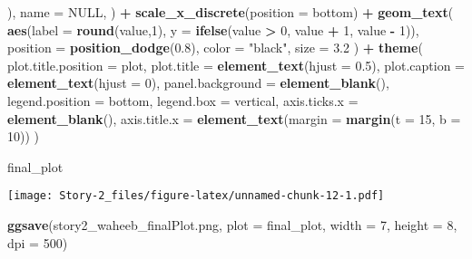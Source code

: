 \documentclass[
]{article}
\newenvironment{Shaded}{\begin{snugshade}}{\end{snugshade}}
\newcommand{\AttributeTok}[1]{\textcolor[rgb]{0.13,0.29,0.53}{#1}}
\newcommand{\ConstantTok}[1]{\textcolor[rgb]{0.56,0.35,0.01}{#1}}
\newcommand{\DecValTok}[1]{\textcolor[rgb]{0.00,0.00,0.81}{#1}}
\newcommand{\FloatTok}[1]{\textcolor[rgb]{0.00,0.00,0.81}{#1}}
\newcommand{\FunctionTok}[1]{\textcolor[rgb]{0.13,0.29,0.53}{\textbf{#1}}}
\newcommand{\NormalTok}[1]{#1}
\newcommand{\SpecialCharTok}[1]{\textcolor[rgb]{0.81,0.36,0.00}{\textbf{#1}}}
\newcommand{\StringTok}[1]{\textcolor[rgb]{0.31,0.60,0.02}{#1}}
\begin{document}
\begin{Shaded}
\begin{Highlighting}[]
\NormalTok{    ), }
    \AttributeTok{name =} \ConstantTok{NULL}\NormalTok{,}
\NormalTok{  ) }\SpecialCharTok{+}
  \FunctionTok{scale\_x\_discrete}\NormalTok{(}\AttributeTok{position =} \StringTok{\textquotesingle{}bottom\textquotesingle{}}\NormalTok{) }\SpecialCharTok{+}
  \FunctionTok{geom\_text}\NormalTok{(}
    \FunctionTok{aes}\NormalTok{(}\AttributeTok{label =} \FunctionTok{round}\NormalTok{(value,}\DecValTok{1}\NormalTok{), }\AttributeTok{y =} \FunctionTok{ifelse}\NormalTok{(value }\SpecialCharTok{\textgreater{}} \DecValTok{0}\NormalTok{, value }\SpecialCharTok{+} \DecValTok{1}\NormalTok{, value }\SpecialCharTok{{-}} \DecValTok{1}\NormalTok{)),}
    \AttributeTok{position =} \FunctionTok{position\_dodge}\NormalTok{(}\FloatTok{0.8}\NormalTok{),}
    \AttributeTok{color =} \StringTok{"black"}\NormalTok{, }\AttributeTok{size =} \FloatTok{3.2}
\NormalTok{  ) }\SpecialCharTok{+}
  \FunctionTok{theme}\NormalTok{(}
    \AttributeTok{plot.title.position =} \StringTok{\textquotesingle{}plot\textquotesingle{}}\NormalTok{,}
    \AttributeTok{plot.title =} \FunctionTok{element\_text}\NormalTok{(}\AttributeTok{hjust =} \FloatTok{0.5}\NormalTok{),}
    \AttributeTok{plot.caption =} \FunctionTok{element\_text}\NormalTok{(}\AttributeTok{hjust =} \DecValTok{0}\NormalTok{),}
    \AttributeTok{panel.background =} \FunctionTok{element\_blank}\NormalTok{(),}
    \AttributeTok{legend.position =} \StringTok{\textquotesingle{}bottom\textquotesingle{}}\NormalTok{, }\AttributeTok{legend.box =} \StringTok{\textquotesingle{}vertical\textquotesingle{}}\NormalTok{,}
    \AttributeTok{axis.ticks.x =} \FunctionTok{element\_blank}\NormalTok{(),}
    \AttributeTok{axis.title.x =} \FunctionTok{element\_text}\NormalTok{(}\AttributeTok{margin =} \FunctionTok{margin}\NormalTok{(}\AttributeTok{t =} \DecValTok{15}\NormalTok{, }\AttributeTok{b =} \DecValTok{10}\NormalTok{))}
\NormalTok{  )}

\NormalTok{final\_plot}
\end{Highlighting}
\end{Shaded}

\texttt{[image: Story-2\_files/figure-latex/unnamed-chunk-12-1.pdf]}

\begin{Shaded}
\begin{Highlighting}[]
\FunctionTok{ggsave}\NormalTok{(}\StringTok{\textquotesingle{}story2\_waheeb\_finalPlot.png\textquotesingle{}}\NormalTok{, }\AttributeTok{plot =}\NormalTok{ final\_plot, }\AttributeTok{width =} \DecValTok{7}\NormalTok{, }\AttributeTok{height =} \DecValTok{8}\NormalTok{, }\AttributeTok{dpi =} \DecValTok{500}\NormalTok{)}
\end{Highlighting}
\end{Shaded}
\end{document}
